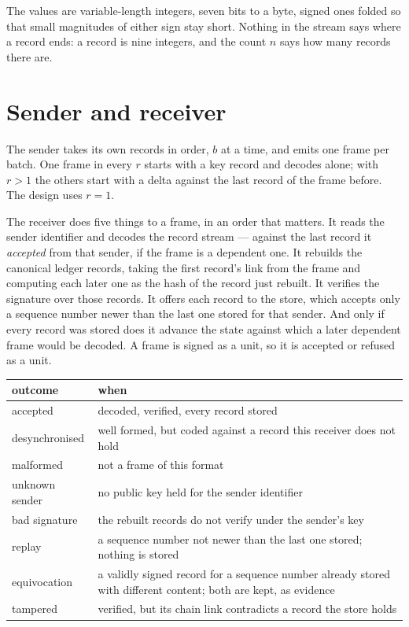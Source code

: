 The values are variable-length integers, seven bits to a byte, signed ones folded so that small
magnitudes of either sign stay short. Nothing in the stream says where a record ends: a record
is nine integers, and the count $n$ says how many records there are.

\section{Sender and receiver}\label{sec:protocol}

The sender takes its own records in order, $b$ at a time, and emits one frame per batch. One
frame in every $r$ starts with a key record and decodes alone; with $r > 1$ the others start with
a delta against the last record of the frame before. The design uses $r = 1$.

The receiver does five things to a frame, in an order that matters. It reads the sender
identifier and decodes the record stream --- against the last record it \emph{accepted} from that
sender, if the frame is a dependent one. It rebuilds the canonical ledger records, taking the
first record's link from the frame and computing each later one as the hash of the record just
rebuilt. It verifies the signature over those records. It offers each record to the store, which
accepts only a sequence number newer than the last one stored for that sender. And only if every
record was stored does it advance the state against which a later dependent frame would be
decoded. A frame is signed as a unit, so it is accepted or refused as a unit.

{\small
\noindent\begin{tabularx}{\textwidth}{@{}l Y@{}}
\toprule
outcome & when \\
\midrule
accepted & decoded, verified, every record stored \\
desynchronised & well formed, but coded against a record this receiver does not hold \\
malformed & not a frame of this format \\
unknown sender & no public key held for the sender identifier \\
bad signature & the rebuilt records do not verify under the sender's key \\
replay & a sequence number not newer than the last one stored; nothing is stored \\
equivocation & a validly signed record for a sequence number already stored with different
content; both are kept, as evidence \\
tampered & verified, but its chain link contradicts a record the store holds \\
\bottomrule
\end{tabularx}
}

